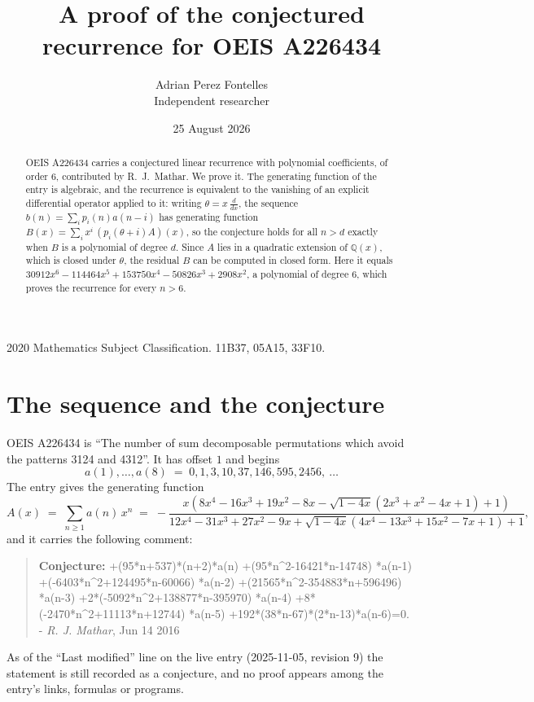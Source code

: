 \documentclass[11pt,a4paper]{article}
\title{A proof of the conjectured recurrence for OEIS A226434}
\author{Adrian Perez Fontelles\\ \small Independent researcher}
\date{25 August 2026}
\theoremstyle{plain}
\theoremstyle{definition}
\begin{document}
\maketitle

\begin{abstract}
OEIS A226434 carries a conjectured linear recurrence with polynomial coefficients, of
order 6, contributed by R.~J.~Mathar. We prove it. The generating function of the
entry is algebraic, and the recurrence is equivalent to the vanishing of an explicit
differential operator applied to it: writing $\theta=x\,\frac{d}{dx}$, the sequence
$b(n)=\sum_{i}p_{i}(n)a(n-i)$ has generating function
$B(x)=\sum_{i}x^{i}\,(p_{i}(\theta+i)A)(x)$, so the conjecture holds for all $n>d$ exactly
when $B$ is a polynomial of degree $d$. Since $A$ lies in a quadratic extension of
$\mathbb{Q}(x)$, which is closed under $\theta$, the residual $B$ can be computed in
closed form. Here it equals $30912 x^{6} - 114464 x^{5} + 153750 x^{4} - 50826 x^{3} + 2908 x^{2}$, a polynomial of degree $6$, which proves
the recurrence for every $n>6$.
\end{abstract}

\noindent\small 2020 Mathematics Subject Classification. 11B37, 05A15, 33F10.\normalsize

\section{The sequence and the conjecture}

OEIS A226434 is ``The number of sum decomposable permutations which avoid the patterns 3124 and 4312''. It has offset $1$ and begins
\[
a(1),\dots,a(8)\;=\;0, 1, 3, 10, 37, 146, 595, 2456,\ \dots
\]
The entry gives the generating function
\begin{equation}\label{eq:gf}
A(x)\;=\;\sum_{n\ge 1} a(n)\,x^{n}\;=\;- \frac{x \left(8 x^{4} - 16 x^{3} + 19 x^{2} - 8 x - \sqrt{1 - 4 x} \left(2 x^{3} + x^{2} - 4 x + 1\right) + 1\right)}{12 x^{4} - 31 x^{3} + 27 x^{2} - 9 x + \sqrt{1 - 4 x} \left(4 x^{4} - 13 x^{3} + 15 x^{2} - 7 x + 1\right) + 1} ,
\end{equation}
and it carries the following comment:
\begin{quote}\small
\textbf{Conjecture:} +(95*n+537)*(n+2)*a(n) +(95*n\^{}2-16421*n-14748) *a(n-1) +(-6403*n\^{}2+124495*n-60066) *a(n-2) +(21565*n\^{}2-354883*n+596496) *a(n-3) +2*(-5092*n\^{}2+138877*n-395970)  *a(n-4) +8*(-2470*n\^{}2+11113*n+12744) *a(n-5) +192*(38*n-67)*(2*n-13)*a(n-6)=0. - \emph{R. J. Mathar}, Jun 14 2016
\end{quote}
As of the ``Last modified'' line on the live entry (2025-11-05, revision 9) the
statement is still recorded as a conjecture, and no proof appears among the entry's links,
formulas or programs.
\end{document}
